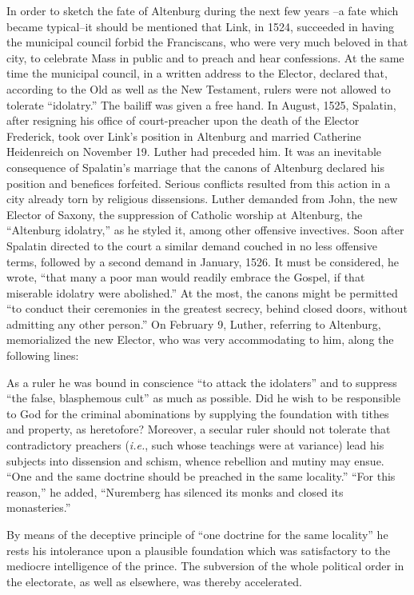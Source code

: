 In order to sketch the fate of Altenburg during the next few years
--a fate which became typical--it should be mentioned that Link,
in 1524, succeeded in having the municipal council forbid the Franciscans,
who were very much beloved in that city, to celebrate Mass
in public and to preach and hear confessions. At the same time the
municipal council, in a written address to the Elector, declared that,
according to the Old as well as the New Testament, rulers were
not allowed to tolerate “idolatry.” The bailiff was given a free hand. In
August, 1525, Spalatin, after resigning his office of court-preacher
upon the death of the Elector Frederick, took over Link’s position
in Altenburg and married Catherine Heidenreich on November 19.
Luther had preceded him. It was an inevitable consequence of Spalatin’s
marriage that the canons of Altenburg declared his position and
benefices forfeited. Serious conflicts resulted from this action in a
city already torn by religious dissensions. Luther demanded from
John, the new Elector of Saxony, the suppression of Catholic worship at
Altenburg, the “Altenburg idolatry,” as he styled it, among
other offensive invectives. Soon after Spalatin directed to the court a
similar demand couched in no less offensive terms, followed by a
second demand in January, 1526. It must be considered, he wrote,
“that many a poor man would readily embrace the Gospel, if that
miserable idolatry were abolished.” At the most, the canons might
be permitted “to conduct their ceremonies in the greatest secrecy,
behind closed doors, without admitting any other person.” On February 9,
Luther, referring to Altenburg, memorialized the new
Elector, who was very accommodating to him, along the following
lines:

As a ruler he was bound in conscience “to attack the idolaters” and
to suppress “the false, blasphemous cult” as much as possible. Did he
wish to be responsible to God for the criminal abominations by supplying
the foundation with tithes and property, as heretofore? Moreover,
a secular ruler should not tolerate that contradictory preachers
(\textit{i.e.}, such whose teachings were at variance) lead his subjects into
dissension and schism, whence rebellion and mutiny may ensue. “One
and the same doctrine should be preached in the same locality.” “For
this reason,” he added, “Nuremberg has silenced its monks and closed
its monasteries.”

By means of the deceptive principle of “one doctrine for the same
locality” he rests his intolerance upon a plausible foundation which
was satisfactory to the mediocre intelligence of the prince. The subversion
of the whole political order in the electorate, as well as elsewhere, was
thereby accelerated.

